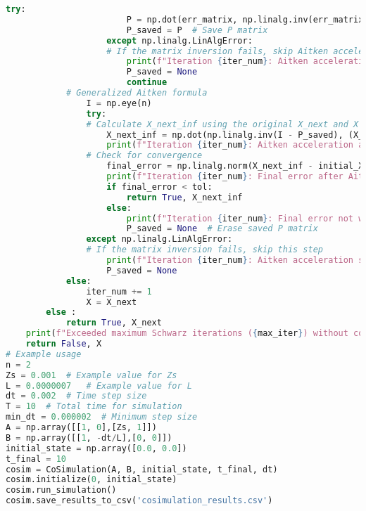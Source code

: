 \begin{lstlisting}[style=vscode, language=python, label={tab:A7},caption={méta-modèle d'une plateforme de co-simulation}]
                    try:
                        P = np.dot(err_matrix, np.linalg.inv(err_matrix_prev))
                        P_saved = P  # Save P matrix
                    except np.linalg.LinAlgError:
                    # If the matrix inversion fails, skip Aitken acceleration for this iteration
                        print(f"Iteration {iter_num}: Aitken acceleration skipped due to LinAlgError")
                        P_saved = None
                        continue
            # Generalized Aitken formula
                I = np.eye(n)
                try:
                # Calculate X_next_inf using the original X_next and X from iteration 0
                    X_next_inf = np.dot(np.linalg.inv(I - P_saved), (X_next - np.dot(P_saved, initial_X)))
                    print(f"Iteration {iter_num}: Aitken acceleration applied")
                # Check for convergence
                    final_error = np.linalg.norm(X_next_inf - initial_X)
                    print(f"Iteration {iter_num}: Final error after Aitken acceleration = {final_error}")
                    if final_error < tol:
                        return True, X_next_inf
                    else:
                        print(f"Iteration {iter_num}: Final error not within tolerance, recalculating P matrix.")
                        P_saved = None  # Erase saved P matrix
                except np.linalg.LinAlgError:
                # If the matrix inversion fails, skip this step
                    print(f"Iteration {iter_num}: Aitken acceleration skipped due to LinAlgError")
                    P_saved = None
            else:
                iter_num += 1
                X = X_next
        else : 
            return True, X_next
    print(f"Exceeded maximum Schwarz iterations ({max_iter}) without convergence.")
    return False, X
# Example usage
n = 2
Zs = 0.001  # Example value for Zs  
L = 0.0000007   # Example value for L
dt = 0.002  # Time step size
T = 10  # Total time for simulation
min_dt = 0.000002  # Minimum step size
A = np.array([[1, 0],[Zs, 1]])
B = np.array([[1, -dt/L],[0, 0]])
initial_state = np.array([0.0, 0.0])
t_final = 10
cosim = CoSimulation(A, B, initial_state, t_final, dt)
cosim.initialize(0, initial_state)
cosim.run_simulation()
cosim.save_results_to_csv('cosimulation_results.csv')
\end{lstlisting}

\newpage
